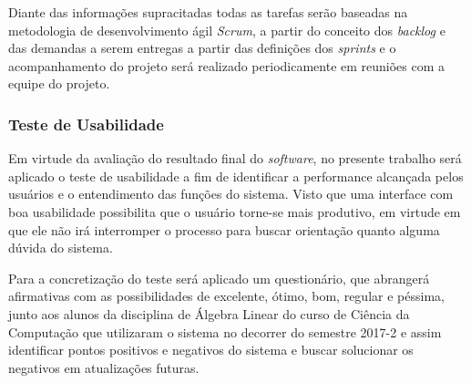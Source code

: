 Diante das informações supracitadas todas as tarefas serão baseadas na metodologia de desenvolvimento ágil \textit{Scrum}, a partir do conceito dos \textit{backlog} e das demandas a serem entregas a partir das definições dos \textit{sprints} e o acompanhamento do projeto será realizado periodicamente em reuniões com a equipe do projeto.

\subsubsection{Teste de Usabilidade}
\noindent Em virtude da avaliação do resultado final do \textit{software}, no presente trabalho será aplicado o teste de usabilidade a fim de identificar a performance alcançada pelos usuários e o entendimento das funções do sistema. Visto que uma interface com boa usabilidade possibilita que o usuário torne-se mais produtivo, em virtude em que ele não irá interromper o processo para buscar orientação quanto alguma dúvida do sistema.

Para a concretização do teste será aplicado um questionário, que abrangerá afirmativas com as possibilidades de excelente, ótimo, bom, regular e péssima, junto aos alunos da disciplina de Álgebra Linear do curso de Ciência da Computação que utilizaram o sistema no decorrer do semestre 2017-2 e assim identificar pontos positivos e negativos do sistema e buscar solucionar os negativos em atualizações futuras. 

\begin{comment}
\subsection{Diagramas UML}
\noindent

\subsubsection{Diagrama de Caso de Uso}
\noindent

\subsubsection{Diagrama de Classe}
\noindent

\subsubsection{Diagrama de Atividade}
\noindent

\subsubsection{Diagrama de Implementação}
\noindent
\end{comment}

